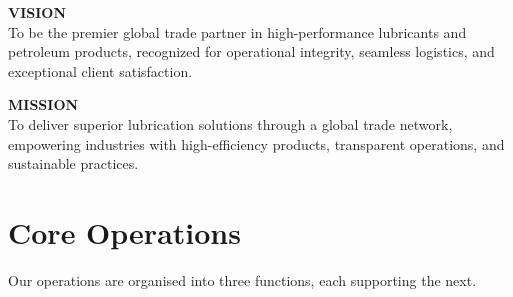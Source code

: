 \documentclass[11pt,letterpaper]{article}
\let\OmpOldSection\section
\renewcommand{\section}{\needspace{5\baselineskip}\OmpOldSection}
\newcommand{\todo}[1]{{\color{black}\bfseries\hl{[#1]}}}
\begin{document}
\begin{tcolorbox}[colback=lightbox, colframe=corpblue, boxrule=0.6pt,
                  arc=1.5pt, left=1.2em, right=1.2em, top=0.7em, bottom=0.7em]
  {\sffamily\bfseries\color{corpblue}VISION}\\[0.3em]
  To be the premier global trade partner in high-performance lubricants and
  petroleum products, recognized for operational integrity, seamless
  logistics, and exceptional client satisfaction.

  \medskip
  {\sffamily\bfseries\color{corpblue}MISSION}\\[0.3em]
  To deliver superior lubrication solutions through a global trade network,
  empowering industries with high-efficiency products, transparent
  operations, and sustainable practices.
\end{tcolorbox}

\needspace{10cm}                        %
\section{Core Operations}

Our operations are organised into three functions, each supporting the next.
\end{document}

